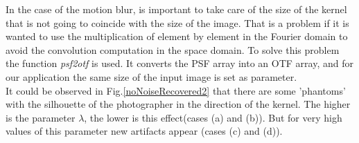 \documentclass[a4paper, 10pt, conference] {article}
\begin{document}
In the case of the motion blur, is important to take care of the size of the kernel that is not going to coincide with the size of the image. That is a problem if it is wanted to use the multiplication of element by element in the Fourier domain to avoid the convolution computation in the space domain. To solve this problem the function \textit{psf2otf} is used. It converts the PSF array into an OTF array, and for our application the same size of the input image is set as parameter.\\
It could be observed in Fig.\ref{noNoiseRecovered2} that there are some 'phantoms' with the silhouette of the photographer in the direction of the kernel. The higher is the parameter $\lambda$, the lower is this effect(cases (a) and (b)). But for very high values of this parameter new artifacts appear (cases (c) and (d)).  
\end{document}
